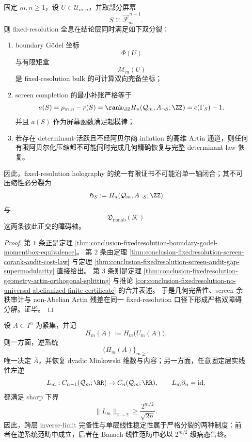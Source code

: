\begin{theorem}[固定分辨率全息的双障碍分解]\label{thm:conclusion-fixedresolution-holography-double-obstruction-synthesis}
固定 \(m,n\ge 1\)，设 \(U\in\mathcal U_{m,n}\)，并取部分屏幕
\[
S\subseteq \overrightarrow{\mathcal F}^{\,n-1}_m.
\]
则 fixed-resolution 全息在结论层同时满足如下双分裂：
\begin{enumerate}
  \item boundary Gödel 坐标
  \[
  \Phi(U)
  \]
  与有限矩盒
  \[
  \mathcal M_m(U)
  \]
  是 fixed-resolution bulk 的可计算双向完备坐标；
  \item screen completion 的最小补账严格等于
  \[
  a(S)=\rho_{m,n}-r(S)=\rank_\ZZ H_n(\mathcal Q_m,A_{\neg S};\ZZ)=c(\Gamma_S)-1,
  \]
  并且 \(a(S)\) 作为屏幕函数满足超模律；
  \item 若存在 determinant-活跃且不经阿贝尔商 inflation 的高维 Artin 通道，则任何有限阿贝尔化压缩都不可能同时完成几何精确恢复与完整 determinant law 恢复。
\end{enumerate}
因此，fixed-resolution holography 的统一有限证书不可能沿单一轴闭合；其不可压缩性必分裂为
\[
\mathfrak H_S:=H_n(\mathcal Q_m,A_{\neg S};\ZZ)
\]
与
\[
\mathfrak D_{\mathrm{nonab}}(\mathcal K)
\]
这两条彼此正交的障碍轴。
\end{theorem}

\begin{proof}
第 \(1\) 条正是定理 \ref{thm:conclusion-fixedresolution-boundary-godel-momentbox-equivalence}。
第 \(2\) 条由定理 \ref{thm:conclusion-fixedresolution-screen-corank-audit-cost-law} 与定理 \ref{thm:conclusion-fixedresolution-screen-audit-gap-supermodularity} 直接给出。
第 \(3\) 条则是定理 \ref{thm:conclusion-fixedresolution-geometry-artin-orthogonal-splitting} 与推论 \ref{cor:conclusion-fixedresolution-no-universal-abelianized-finite-certificate} 的合并表述。
于是几何完备性、screen 余秩审计与 non-Abelian Artin 残差在同一 fixed-resolution 口径下形成严格双障碍分解。证毕。
\end{proof}

\begin{theorem}[逆极限完备性与单层稳定性的指数分裂]\label{thm:conclusion-projective-completeness-singlelayer-instability-synthesis}
设 \(A\subset I^n\) 为紧集，并记
\[
H_m(A):=H_m\!\bigl(U_m(A)\bigr).
\]
则一方面，逆系统
\[
\{H_m(A)\}_{m\ge 1}
\]
唯一决定 \(\overline A\)，并恢复 dyadic Minkowski 维数与内容；另一方面，任意固定层实线性左逆
\[
L_m:C_{n-1}(\mathcal Q_m;\RR)\to C_n(\mathcal Q_m;\RR),
\qquad
L_m\partial_n=\mathrm{id},
\]
都满足 sharp 下界
\[
\|L_m\|_{2\to2}\ge \frac{2^{m/2}}{\sqrt{2n}}.
\]
因此，跨层 inverse-limit 完备性与单层线性稳定性属于严格分裂的两种制度：前者在逆系统范畴中成立，后者在 Banach 线性范畴中必以 \(2^{m/2}\) 级病态告终。
\end{theorem}

